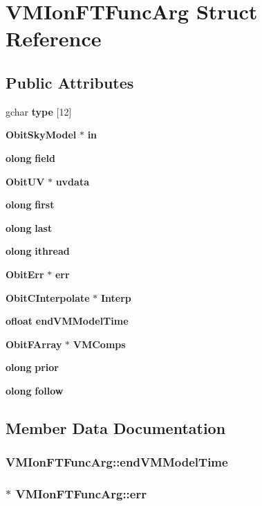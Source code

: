 \section{VMIon\-FTFunc\-Arg Struct Reference}
\label{structVMIonFTFuncArg}
\subsection*{Public Attributes}
\begin{CompactItemize}
\item 
gchar {\bf type} [12]
\item 
{\bf Obit\-Sky\-Model} $\ast$ {\bf in}
\item 
{\bf olong} {\bf field}
\item 
{\bf Obit\-UV} $\ast$ {\bf uvdata}
\item 
{\bf olong} {\bf first}
\item 
{\bf olong} {\bf last}
\item 
{\bf olong} {\bf ithread}
\item 
{\bf Obit\-Err} $\ast$ {\bf err}
\item 
{\bf Obit\-CInterpolate} $\ast$ {\bf Interp}
\item 
{\bf ofloat} {\bf end\-VMModel\-Time}
\item 
{\bf Obit\-FArray} $\ast$ {\bf VMComps}
\item 
{\bf olong} {\bf prior}
\item 
{\bf olong} {\bf follow}
\end{CompactItemize}


\subsection{Member Data Documentation}
\subsubsection{ {\bf VMIon\-FTFunc\-Arg::end\-VMModel\-Time}}\label{structVMIonFTFuncArg_o9}


\subsubsection{$\ast$ {\bf VMIon\-FTFunc\-Arg::err}}\label{structVMIonFTFuncArg_o7}


